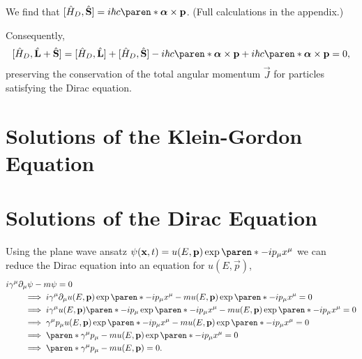 \documentclass[11pt]{penrose}
\begin{document}
We find that $\comm{\qop{H}_D, \qop{\vec{S}}} = i\hbar c \paren*{\vec{\alpha} \times \vec{p}}$. (Full calculations in the appendix.)

Consequently,
\begin{equation}
    \comm{\qop{H}_D, \qop{\vec{L}} + \qop{\vec{S}}}
    = \comm{\qop{H}_D, \qop{\vec{L}}} + \comm{\qop{H}_D, \qop{\vec{S}}}
    - i\hbar c \paren*{\vec{\alpha} \times \vec{p}} + i\hbar c \paren*{\vec{\alpha} \times \vec{p}}
    = 0,
\end{equation}
preserving the conservation of the total angular momentum $\vec{J}$ for particles satisfying the Dirac equation.

\section{Solutions of the Klein-Gordon Equation}

\section{Solutions of the Dirac Equation}

Using the plane wave ansatz $\psi(\vec{x}, t) = u(E, \vec{p}) \exp\paren*{-ip_{\mu} x^{\mu}}$ we can reduce the Dirac equation into an equation for $u(E, \vec{p})$,
\begin{align}
    \MoveEqLeft i \gamma^\mu \pd_\mu \psi - m \psi = 0\\
    &\implies i \gamma^\mu \pd_\mu u(E, \vec{p}) \exp\paren*{-ip_{\mu} x^{\mu}} - m u(E, \vec{p}) \exp\paren*{-ip_{\mu} x^{\mu}} = 0\\
    &\implies i \gamma^\mu u(E, \vec{p}) \paren*{-i p_\mu} \exp\paren*{-ip_{\mu} x^{\mu}} - m u(E, \vec{p}) \exp\paren*{-ip_{\mu} x^{\mu}} = 0\\
    &\implies \gamma^\mu p_\mu u(E, \vec{p}) \exp\paren*{-ip_{\mu} x^{\mu}} - m u(E, \vec{p}) \exp\paren*{-ip_{\mu} x^{\mu}} = 0\\
    &\implies \paren*{\gamma^\mu p_\mu - m} u(E, \vec{p}) \exp\paren*{-ip_{\mu} x^{\mu}} = 0\\
    &\implies \paren*{\gamma^\mu p_\mu - m} u(E, \vec{p}) = 0.
\end{align}
\end{document}
